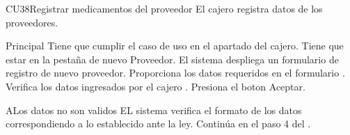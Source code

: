 	\begin{UseCase}{CU38}{Registrar medicamentos del proveedor}{
		El cajero registra datos de los proveedores.
	}
	\end{UseCase}
	\begin{UCtrayectoria}{Principal}
		\UCpaso[\UCactor] Tiene que cumplir el caso de uso  en el apartado del cajero.
		\UCpaso[\UCactor] Tiene que estar en la pestaña de nuevo Proveedor.
		\UCpaso El sistema despliega un formulario de registro de nuevo proveedor. 
		\UCpaso [\UCactor] Proporciona los datos requeridos en el formulario .
		\UCpaso Verifica los datos ingresados por el cajero .
		\UCpaso Presiona el boton Aceptar.
	\end{UCtrayectoria}

	\begin{UCtrayectoriaA}{A}{Los datos no son validos}
			\UCpaso EL sistema verifica el formato de los datos correspondiendo a lo establecido ante la ley.
			\UCpaso Continúa en el paso 4 del .
		\end{UCtrayectoriaA}
		